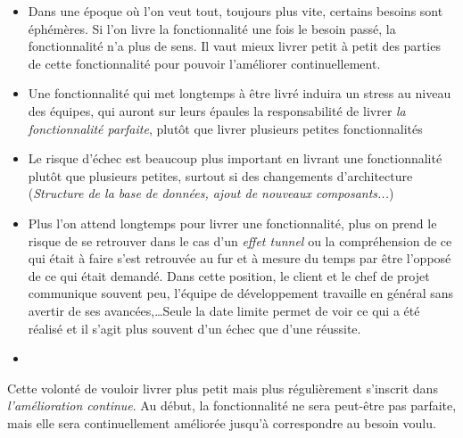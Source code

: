 \begin{itemize}
	\setlength\itemsep{0em}
	\item Dans une époque où l'on veut tout, toujours plus vite, certains besoins sont éphémères. Si l'on livre la fonctionnalité une fois le besoin passé, la fonctionnalité n'a plus de sens. Il vaut mieux livrer petit à petit des parties de cette fonctionnalité pour pouvoir l'améliorer continuellement.
	\item Une fonctionnalité qui met longtemps à être livré induira un stress au niveau des équipes, qui auront sur leurs épaules la responsabilité de livrer \emph{la fonctionnalité parfaite}, plutôt que livrer plusieurs petites fonctionnalités
	\item Le risque d'échec est beaucoup plus important en livrant une fonctionnalité plutôt que plusieurs petites, surtout si des changements d'architecture (\emph{Structure de la base de données, ajout de nouveaux composants...})
	\item Plus l'on attend longtemps pour livrer une fonctionnalité, plus on prend le risque de se retrouver dans le cas d'un \emph{effet tunnel} ou la compréhension de ce qui était à faire s'est retrouvée au fur et à mesure du temps par être l'opposé de ce qui était demandé. Dans cette position, le client et le chef de projet communique souvent peu, l'équipe de développement travaille en général sans avertir de ses avancées,\ldots Seule la date limite permet de voir ce qui a été réalisé et il s'agit plus souvent d'un échec que d'une réussite.
	\item {}
\end{itemize}

Cette volonté de vouloir livrer plus petit mais plus régulièrement s'inscrit dans \emph{l'amélioration continue}. Au début, la fonctionnalité ne sera peut-être pas parfaite, mais elle sera continuellement améliorée jusqu'à correspondre au besoin voulu. 


